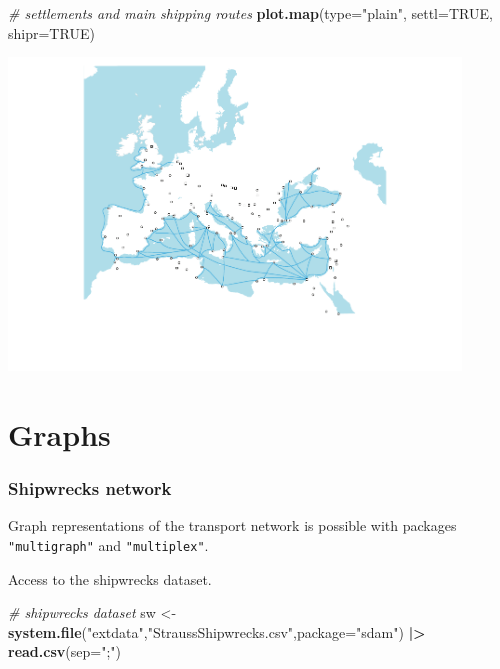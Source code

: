 \documentclass[a4paper,11pt]{memoir}
\newenvironment{Shaded}{\begin{snugshade}}{\end{snugshade}}
\newcommand{\CommentTok}[1]{\textcolor[rgb]{0.56,0.35,0.01}{\textit{#1}}}
\newcommand{\DataTypeTok}[1]{\textcolor[rgb]{0.13,0.29,0.53}{#1}}
\newcommand{\ErrorTok}[1]{\textcolor[rgb]{0.64,0.00,0.00}{\textbf{#1}}}
\newcommand{\KeywordTok}[1]{\textcolor[rgb]{0.13,0.29,0.53}{\textbf{#1}}}
\newcommand{\NormalTok}[1]{#1}
\newcommand{\OperatorTok}[1]{\textcolor[rgb]{0.81,0.36,0.00}{\textbf{#1}}}
\newcommand{\OtherTok}[1]{\textcolor[rgb]{0.56,0.35,0.01}{#1}}
\newcommand{\StringTok}[1]{\textcolor[rgb]{0.31,0.60,0.02}{#1}}
\begin{document}
\begin{Shaded}
\begin{Highlighting}[]
\CommentTok{# settlements and main shipping routes}
\KeywordTok{plot.map}\NormalTok{(}\DataTypeTok{type=}\StringTok{"plain"}\NormalTok{, }\DataTypeTok{settl=}\OtherTok{TRUE}\NormalTok{, }\DataTypeTok{shipr=}\OtherTok{TRUE}\NormalTok{)}
\end{Highlighting}
\end{Shaded}

{\centering
\includegraphics[width=12cm, trim=0 0 0 0, clip]{img/unnamed-chunk-9-1} 
}

\hypertarget{graphs}{%
\section{Graphs}\label{graphs}}

\hypertarget{shipwrecks-network}{%
\subsubsection{Shipwrecks network}\label{shipwrecks-network}}

Graph representations of the transport network is possible with packages
\texttt{"multigraph"} and \texttt{"multiplex"}.

Access to the shipwrecks dataset.

\begin{Shaded}
\begin{Highlighting}[]
\CommentTok{# shipwrecks dataset}
\NormalTok{sw <-}\StringTok{ }\KeywordTok{system.file}\NormalTok{(}\StringTok{"extdata"}\NormalTok{,}\StringTok{"StraussShipwrecks.csv"}\NormalTok{,}\DataTypeTok{package=}\StringTok{"sdam"}\NormalTok{) }\OperatorTok{|}\ErrorTok{>}\StringTok{ }
\StringTok{  }\KeywordTok{read.csv}\NormalTok{(}\DataTypeTok{sep=}\StringTok{";"}\NormalTok{)}
\end{Highlighting}
\end{Shaded}
\end{document}
